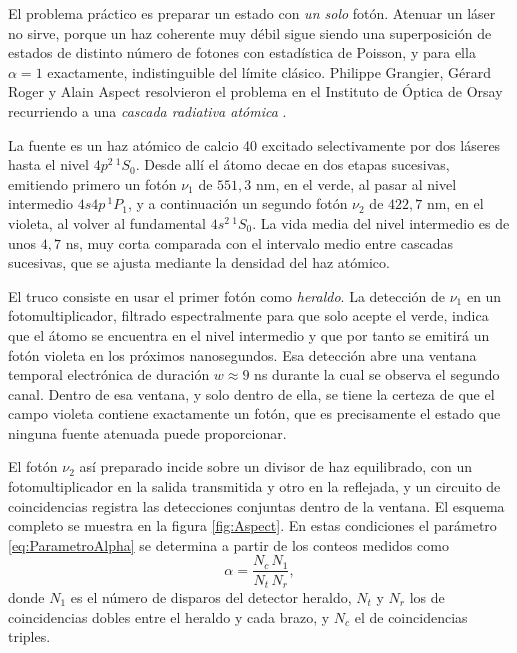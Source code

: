             El problema práctico es preparar un estado con \textit{un solo} fotón. Atenuar un láser no sirve, porque un haz coherente muy débil sigue siendo una superposición de estados de distinto número de fotones con estadística de Poisson, y para ella $\alpha = 1$ exactamente, indistinguible del límite clásico. Philippe Grangier, Gérard Roger y Alain Aspect resolvieron el problema en el Instituto de Óptica de Orsay recurriendo a una \textit{cascada radiativa atómica} \citep{Alan-Aspect}.

            La fuente es un haz atómico de calcio 40 excitado selectivamente por dos láseres hasta el nivel $4p^{2}\,{}^{1}S_{0}$. Desde allí el átomo decae en dos etapas sucesivas, emitiendo primero un fotón $\nu_{1}$ de $551{,}3$ nm, en el verde, al pasar al nivel intermedio $4s4p\,{}^{1}P_{1}$, y a continuación un segundo fotón $\nu_{2}$ de $422{,}7$ nm, en el violeta, al volver al fundamental $4s^{2}\,{}^{1}S_{0}$. La vida media del nivel intermedio es de unos $4{,}7$ ns, muy corta comparada con el intervalo medio entre cascadas sucesivas, que se ajusta mediante la densidad del haz atómico.

            El truco consiste en usar el primer fotón como \textit{heraldo}. La detección de $\nu_{1}$ en un fotomultiplicador, filtrado espectralmente para que solo acepte el verde, indica que el átomo se encuentra en el nivel intermedio y que por tanto se emitirá un fotón violeta en los próximos nanosegundos. Esa detección abre una ventana temporal electrónica de duración $w\approx 9$ ns durante la cual se observa el segundo canal. Dentro de esa ventana, y solo dentro de ella, se tiene la certeza de que el campo violeta contiene exactamente un fotón, que es precisamente el estado que ninguna fuente atenuada puede proporcionar.

            El fotón $\nu_{2}$ así preparado incide sobre un divisor de haz equilibrado, con un fotomultiplicador en la salida transmitida y otro en la reflejada, y un circuito de coincidencias registra las detecciones conjuntas dentro de la ventana. El esquema completo se muestra en la figura \ref{fig:Aspect}. En estas condiciones el parámetro \eqref{eq:ParametroAlpha} se determina a partir de los conteos medidos como
            \begin{equation}\label{eq:AlphaMedido}
                \alpha = \frac{N_{c}\,N_{1}}{N_{t}\,N_{r}},
            \end{equation}
            donde $N_{1}$ es el número de disparos del detector heraldo, $N_{t}$ y $N_{r}$ los de coincidencias dobles entre el heraldo y cada brazo, y $N_{c}$ el de coincidencias triples.

